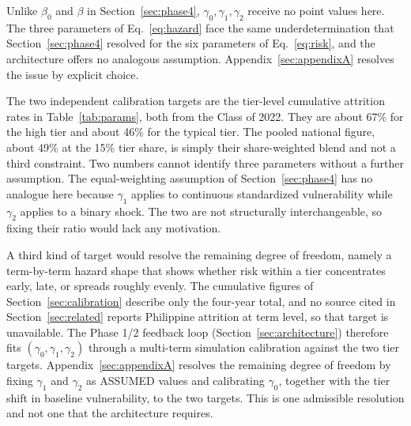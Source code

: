 \documentclass[11pt]{article}
\begin{document}
Unlike $\beta_0$ and $\beta$ in Section~\ref{sec:phase4}, $\gamma_0,\gamma_1,\gamma_2$ receive no point values here. The three parameters of Eq.~\ref{eq:hazard} face the same underdetermination that Section~\ref{sec:phase4} resolved for the six parameters of Eq.~\ref{eq:risk}, and the architecture offers no analogous assumption. Appendix~\ref{sec:appendixA} resolves the issue by explicit choice.

The two independent calibration targets are the tier-level cumulative attrition rates in Table~\ref{tab:params}, both from the Class of 2022. They are about 67\% for the high tier and about 46\% for the typical tier. The pooled national figure, about 49\% at the 15\% tier share, is simply their share-weighted blend and not a third constraint. Two numbers cannot identify three parameters without a further assumption. The equal-weighting assumption of Section~\ref{sec:phase4} has no analogue here because $\gamma_1$ applies to continuous standardized vulnerability while $\gamma_2$ applies to a binary shock. The two are not structurally interchangeable, so fixing their ratio would lack any motivation.

A third kind of target would resolve the remaining degree of freedom, namely a term-by-term hazard shape that shows whether risk within a tier concentrates early, late, or spreads roughly evenly. The cumulative figures of Section~\ref{sec:calibration} describe only the four-year total, and no source cited in Section~\ref{sec:related} reports Philippine attrition at term level, so that target is unavailable. The Phase 1/2 feedback loop (Section~\ref{sec:architecture}) therefore fits $(\gamma_0,\gamma_1,\gamma_2)$ through a multi-term simulation calibration against the two tier targets. Appendix~\ref{sec:appendixA} resolves the remaining degree of freedom by fixing $\gamma_1$ and $\gamma_2$ as ASSUMED values and calibrating $\gamma_0$, together with the tier shift in baseline vulnerability, to the two targets. This is one admissible resolution and not one that the architecture requires.
\end{document}
